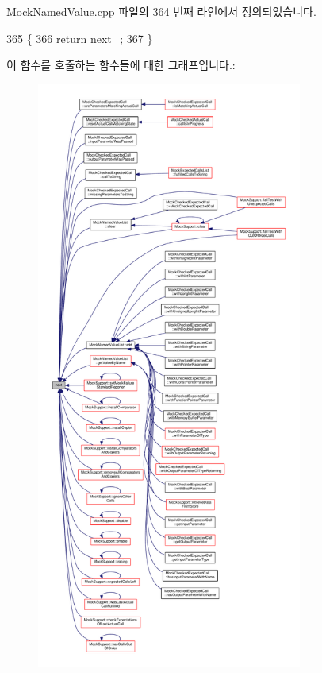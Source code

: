 Mock\+Named\+Value.\+cpp 파일의 364 번째 라인에서 정의되었습니다.


\begin{DoxyCode}
365 \{
366     \textcolor{keywordflow}{return} \hyperlink{class_mock_named_value_list_node_a0cb6abfe488f90be4d539bc57f3a4708}{next\_};
367 \}
\end{DoxyCode}


이 함수를 호출하는 함수들에 대한 그래프입니다.\+:
\nopagebreak
\begin{figure}[H]
\begin{center}
\leavevmode
\includegraphics[height=550pt]{class_mock_named_value_list_node_adaf0ca3232d35f7efae1bade86b8027e_icgraph}
\end{center}
\end{figure}


